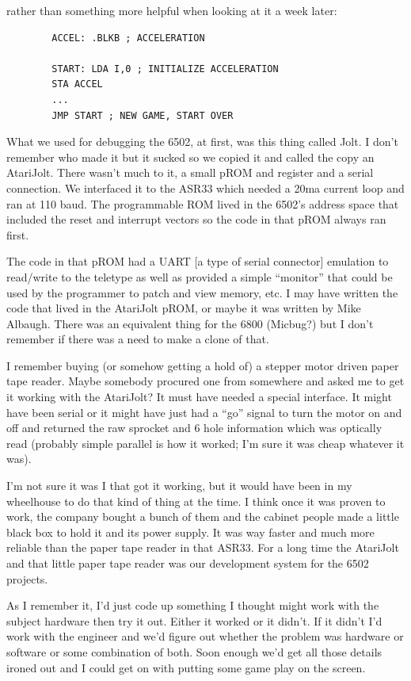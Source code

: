 rather than something more helpful when looking at it a week later:

\begin{lstlisting}
        ACCEL: .BLKB ; ACCELERATION

        START: LDA I,0 ; INITIALIZE ACCELERATION
        STA ACCEL
        ...
        JMP START ; NEW GAME, START OVER
\end{lstlisting}

What we used for debugging the 6502, at first, was this thing called Jolt. I don't remember who made it but it sucked so we copied it and called the copy an AtariJolt. There wasn't much to it, a small pROM and register and a serial connection. We interfaced it to the ASR33 which needed a 20ma current loop and ran at 110 baud. The programmable ROM lived in the 6502's address space that included the reset and interrupt vectors so the code in that pROM always ran first. 

The code in that pROM had a UART [a type of serial connector] emulation to read/write to the teletype as well as provided a simple “monitor” that could be used by the programmer to patch and view memory, etc. I may have written the code that lived in the AtariJolt pROM, or maybe it was written by Mike Albaugh. There was an equivalent thing for the 6800 (Micbug?) but I don't remember if there was a need to make a clone of that.

I remember buying (or somehow getting a hold of) a stepper motor driven paper tape reader. Maybe somebody procured one from somewhere and asked me to get it working with the AtariJolt? It must have needed a special interface. It might have been serial or it might have just had a “go” signal to turn the motor on and off and returned the raw sprocket and 6 hole information which was optically read (probably simple parallel is how it worked; I'm sure it was cheap whatever it was). 

I'm not sure it was I that got it working, but it would have been in my wheelhouse to do that kind of thing at the time. I think once it was proven to work, the company bought a bunch of them and the cabinet people made a little black box to hold it and its power supply. It was way faster and much more reliable than the paper tape reader in that ASR33. For a long time the AtariJolt and that little paper tape reader was our development system for the 6502 projects. 

As I remember it, I'd just code up something I thought might work with the subject hardware then try it out. Either it worked or it didn't. If it didn't I'd work with the engineer and we'd figure out whether the problem was hardware or software or some combination of both. Soon enough we'd get all those details ironed out and I could get on with putting some game play on the screen.


